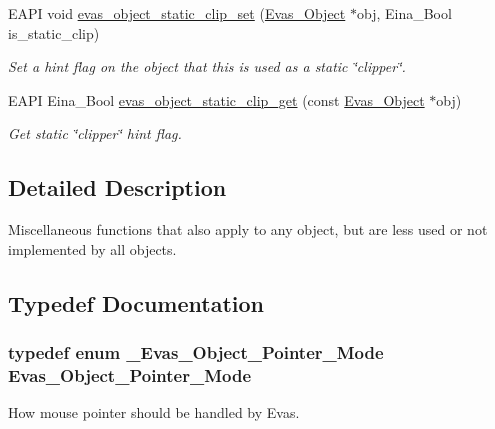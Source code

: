 \begin{DoxyCompactItemize}
EAPI void \hyperlink{group__Evas__Object__Group__Extras_ga8697b24251c2209c60aabb1a5de860a8}{evas\_\-object\_\-static\_\-clip\_\-set} (\hyperlink{group__Evas__Object__Group_ga9e19e6dd1f517a0ba437c0114d3e7c97}{Evas\_\-Object} $\ast$obj, Eina\_\-Bool is\_\-static\_\-clip)
\begin{DoxyCompactList}\small\item\em Set a hint flag on the object that this is used as a static \char`\"{}clipper\char`\"{}. \item\end{DoxyCompactList}\item 
EAPI Eina\_\-Bool \hyperlink{group__Evas__Object__Group__Extras_gafda644be2d6e6360959853c9d6195ec8}{evas\_\-object\_\-static\_\-clip\_\-get} (const \hyperlink{group__Evas__Object__Group_ga9e19e6dd1f517a0ba437c0114d3e7c97}{Evas\_\-Object} $\ast$obj)
\begin{DoxyCompactList}\small\item\em Get static \char`\"{}clipper\char`\"{} hint flag. \item\end{DoxyCompactList}\end{DoxyCompactItemize}


\subsection{Detailed Description}
Miscellaneous functions that also apply to any object, but are less used or not implemented by all objects. 

\subsection{Typedef Documentation}
\subsubsection[{Evas\_\-Object\_\-Pointer\_\-Mode}]{\setlength{\rightskip}{0pt plus 5cm}typedef enum {\bf \_\-Evas\_\-Object\_\-Pointer\_\-Mode}  {\bf Evas\_\-Object\_\-Pointer\_\-Mode}}\label{group__Evas__Object__Group__Extras_ga27baac4c63b590de109e3e3f0d941483}


How mouse pointer should be handled by Evas. 

